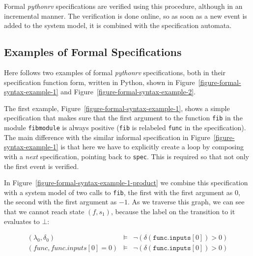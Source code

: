Formal \textit{pythonrv} specifications are verified using this procedure,
although in an incremental manner. The verification is done online, so as soon
as a new event is added to the system model, it is combined with the
specification automata.






\subsection{Examples of Formal Specifications}
\label{section-approach-examples-of-formal-specifications}
\lstset{language=Python,numbers=none}

Here follows two examples of formal \textit{pythonrv} specifications, both in
their specification function form, written in Python, shown in
Figure~\ref{figure-formal-syntax-example-1} and
Figure~\ref{figure-formal-syntax-example-2}.

The first example, Figure~\ref{figure-formal-syntax-example-1}, shows a simple
specification that makes sure that the first argument to the function
\texttt{fib} in the module \texttt{fibmodule} is always positive (\texttt{fib}
is relabeled \texttt{func} in the specification). The main difference with the
similar informal specification in Figure~\ref{figure-syntax-example-1} is that
here we have to explicitly create a loop by composing with a \textit{next}
specification, pointing back to \texttt{spec}. This is required so that not
only the first event is verified.

In Figure~\ref{figure-formal-syntax-example-1-product} we combine this
specification with a system model of two calls to \texttt{fib}, the first with
the first argument as $0$, the second with the first argument as $-1$. As we
traverse this graph, we can see that we cannot reach state $(f, s_1)$, because
the label on the transition to it evaluates to $\bot$:

\medskip
\[
  \begin{array}{rcl}
    (\lambda_0, \delta_0) & \models & \neg (\delta(\texttt{func.inputs$[0]$}) > 0) \\
    (\textit{func}, \textit{func.inputs}[0] = 0) & \models & \neg (\delta(\texttt{func.inputs$[0]$}) > 0) \\
  \end{array}
\]
\medskip

